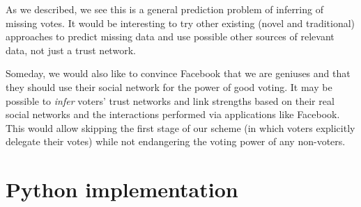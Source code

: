 \documentclass[a4paper]{acm_proc_article-sp}
\begin{document}
As we described, we see this is a general prediction problem of inferring of missing votes. It would be interesting to try
other existing (novel and traditional) approaches to predict missing data and use possible other sources of relevant data,
not just a trust network.

Someday, we would also like to convince Facebook that we are geniuses and that they should use their social network for the
power of good voting.  It may be possible to \emph{infer} voters' trust networks and link strengths based on their real social networks and the
interactions performed via applications like Facebook.  This would allow skipping the first stage of our scheme (in which voters
explicitly delegate their votes) while not endangering the voting power of any non-voters.




\onecolumn

\appendix
\section{Python implementation}

\vspace{1em}

\small

\end{document}
